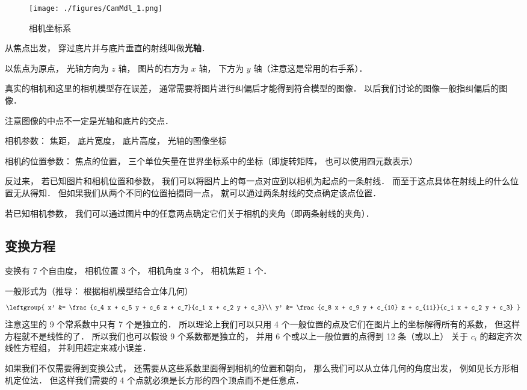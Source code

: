 

\begin{figure}[ht]
\centering
\texttt{[image: ./figures/CamMdl\_1.png]}
\caption{相机坐标系} \label{CamMdl_fig1}
\end{figure}

从焦点出发， 穿过底片并与底片垂直的射线叫做\textbf{光轴}．

以焦点为原点， 光轴方向为 $z$ 轴， 图片的右方为 $x$ 轴， 下方为 $y$ 轴（注意这是常用的右手系）．

真实的相机和这里的相机模型存在误差， 通常需要将图片进行纠偏后才能得到符合模型的图像． 以后我们讨论的图像一般指纠偏后的图像．

注意图像的中点不一定是光轴和底片的交点．

相机参数： 焦距， 底片宽度， 底片高度， 光轴的图像坐标

相机的位置参数： 焦点的位置， 三个单位矢量在世界坐标系中的坐标（即旋转矩阵， 也可以使用四元数表示）

反过来， 若已知图片和相机位置和参数， 我们可以将图片上的每一点对应到以相机为起点的一条射线． 而至于这点具体在射线上的什么位置无从得知． 但如果我们从两个不同的位置拍摄同一点， 就可以通过两条射线的交点确定该点位置．

若已知相机参数， 我们可以通过图片中的任意两点确定它们关于相机的夹角（即两条射线的夹角）．

\subsection{变换方程}
变换有 7 个自由度， 相机位置 3 个， 相机角度 3 个， 相机焦距 1 个．

一般形式为（推导： 根据相机模型结合立体几何）
\begin{equation}\label{CamMdl_eq1}
\leftgroup{
x' &= \frac{c_4 x + c_5 y + c_6 z + c_7}{c_1 x + c_2 y + c_3}\\
y' &= \frac{c_8 x + c_9 y + c_{10} z + c_{11}}{c_1 x + c_2 y + c_3}
}
\end{equation}
注意这里的 9 个常系数中只有 7 个是独立的． 所以理论上我们可以只用 4 个一般位置的点及它们在图片上的坐标解得所有的系数， 但这样方程就不是线性的了． 所以我们也可以假设 9 个系数都是独立的， 并用 6 个或以上一般位置的点得到 12 条（或以上） 关于 $c_i$ 的超定齐次线性方程组， 并利用超定来减小误差．

如果我们不仅需要得到变换公式， 还需要从这些系数里面得到相机的位置和朝向， 那么我们可以从立体几何的角度出发， 例如见长方形相机定位法． 但这样我们需要的 4 个点就必须是长方形的四个顶点而不是任意点．

